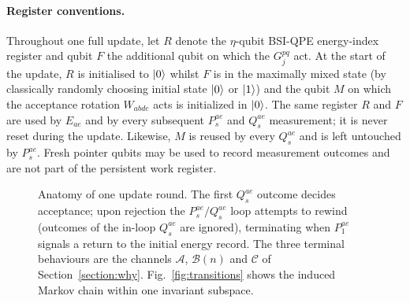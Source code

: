 \documentclass[aps,floatfix,10pt,amssymb,amsfont,amsmath,superscriptaddress,float,nofootinbib,longbibliography,nobalancelastpage,twocolumn]{revtex4-2}
\begin{document}
\paragraph*{Register conventions.}
Throughout one full update, let $R$ denote the $\eta$-qubit BSI-QPE energy-index register and qubit $F$ the additional qubit on which the $G_j^{pq}$ act. At the start of the update, $R$ is initialised to $\ket{0}$ whilst $F$ is in the maximally mixed state (by classically randomly choosing initial state $\ket{0}$ or $\ket{1}$) and the qubit $M$ on which the acceptance rotation $W_{abde}$ acts is initialized in $\ket{0}$. The same register $R$ and $F$ are used by $E_{ae}$ and by every subsequent $P_s^{ae}$ and $Q_s^{ae}$ measurement; it is never reset during the update. Likewise, $M$ is reused by every $Q_s^{ae}$ and is left untouched by $P_s^{ae}$. Fresh pointer qubits may be used to record measurement outcomes and are not part of the persistent work register.
\begin{figure}
    \centering
{}
    \caption{Anatomy of one update round. The first $Q^{ae}_s$ outcome decides acceptance; upon rejection the $P^{ae}_s/Q^{ae}_s$ loop attempts to rewind (outcomes of the in-loop $Q^{ae}_s$ are ignored), terminating when $P^{ae}_1$ signals a return to the initial energy record. The three terminal behaviours are the channels $\mathcal{A}$, $\mathcal{B}(n)$ and $\mathcal{C}$ of Section~\ref{section:why}. Fig.~\ref{fig:transitions} shows the induced Markov chain within one invariant subspace.}
    \label{fig:flowchart}
\end{figure}
\end{document}
